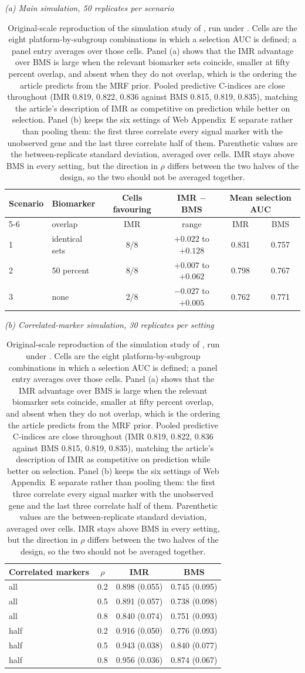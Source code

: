 \documentclass[article]{jss}
\begin{document}
\begin{table}[!ht]
\centering
\textit{(a) Main simulation, 50 replicates per scenario}\\[3pt]
\begin{tabular}{l l c c c c}
\toprule
Scenario & Biomarker & Cells favouring & IMR $-$ BMS &
\multicolumn{2}{c}{Mean selection AUC} \\
\cmidrule(lr){5-6}
 & overlap & IMR & range & IMR & BMS \\
\midrule
1 & identical sets & 8/8 & $+0.022$ to $+0.128$ & 0.831 & 0.757 \\
2 & 50 percent     & 8/8 & $+0.007$ to $+0.062$ & 0.798 & 0.767 \\
3 & none           & 2/8 & $-0.027$ to $+0.005$ & 0.762 & 0.771 \\
\bottomrule
\end{tabular}

\vspace{8pt}
\textit{(b) Correlated-marker simulation, 30 replicates per setting}\\[3pt]
\begin{tabular}{l c c c}
\toprule
Correlated markers & $\rho$ & IMR & BMS \\
\midrule
all  & 0.2 & 0.898 (0.055) & 0.745 (0.095) \\
all  & 0.5 & 0.891 (0.057) & 0.738 (0.098) \\
all  & 0.8 & 0.840 (0.074) & 0.751 (0.093) \\
half & 0.2 & 0.916 (0.050) & 0.776 (0.093) \\
half & 0.5 & 0.943 (0.038) & 0.840 (0.077) \\
half & 0.8 & 0.956 (0.036) & 0.874 (0.067) \\
\bottomrule
\end{tabular}
\caption{\label{tab:simulation-reproduction}Original-scale reproduction of the
simulation study of \citet[Section~5.2 and Web Appendix~E]{chekouo2017}, run
under . Cells are the eight platform-by-subgroup
combinations in which a selection AUC is defined; a panel entry averages over
those cells. Panel (a) shows that the IMR advantage over BMS is large when the
relevant biomarker sets coincide, smaller at fifty percent overlap, and absent
when they do not overlap, which is the ordering the article predicts from the
MRF prior. Pooled predictive C-indices are close throughout (IMR 0.819, 0.822,
0.836 against BMS 0.815, 0.819, 0.835), matching the article's description of
IMR as competitive on prediction while better on selection. Panel (b) keeps the
six settings of Web Appendix~E separate rather than pooling them: the first
three correlate every signal marker with the unobserved gene and the last three
correlate half of them. Parenthetic values are the between-replicate standard
deviation, averaged over cells. IMR stays above BMS in every setting, but the
direction in $\rho$ differs between the two halves of the design, so the two
should not be averaged together.}
\end{table}
\end{document}
